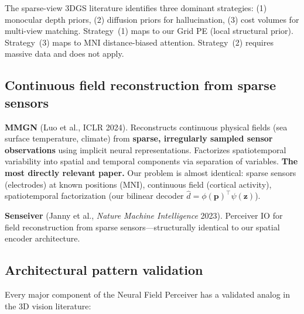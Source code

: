 \documentclass[11pt,letterpaper]{article}
\newcommand{\bfp}{\mathbf{p}}
\newcommand{\bfz}{\mathbf{z}}
\begin{document}
The sparse-view 3DGS literature identifies three dominant strategies: (1) monocular depth priors, (2) diffusion priors for hallucination, (3) cost volumes for multi-view matching. Strategy~(1) maps to our Grid PE (local structural prior). Strategy~(3) maps to MNI distance-biased attention. Strategy~(2) requires massive data and does not apply.

\subsection{Continuous field reconstruction from sparse sensors}

\textbf{MMGN} (Luo et al., ICLR 2024). Reconstructs continuous physical fields (sea surface temperature, climate) from \textbf{sparse, irregularly sampled sensor observations} using implicit neural representations. Factorizes spatiotemporal variability into spatial and temporal components via separation of variables. \textbf{The most directly relevant paper.} Our problem is almost identical: sparse sensors (electrodes) at known positions (MNI), continuous field (cortical activity), spatiotemporal factorization (our bilinear decoder $\hat{d} = \phi(\bfp)^\top\psi(\bfz)$).

\textbf{Senseiver} (Janny et al., \textit{Nature Machine Intelligence} 2023). Perceiver IO for field reconstruction from sparse sensors---structurally identical to our spatial encoder architecture.

\subsection{Architectural pattern validation}

Every major component of the Neural Field Perceiver has a validated analog in the 3D vision literature:
\end{document}
